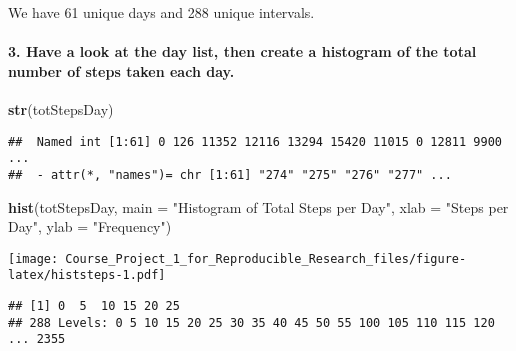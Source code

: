 \documentclass[]{article}
\newenvironment{Shaded}{\begin{snugshade}}{\end{snugshade}}
\newcommand{\KeywordTok}[1]{\textcolor[rgb]{0.13,0.29,0.53}{\textbf{#1}}}
\newcommand{\DataTypeTok}[1]{\textcolor[rgb]{0.13,0.29,0.53}{#1}}
\newcommand{\StringTok}[1]{\textcolor[rgb]{0.31,0.60,0.02}{#1}}
\newcommand{\OperatorTok}[1]{\textcolor[rgb]{0.81,0.36,0.00}{\textbf{#1}}}
\newcommand{\NormalTok}[1]{#1}
\let\oldparagraph\paragraph
\renewcommand{\paragraph}[1]{\oldparagraph{#1}\mbox{}}
\begin{document}
We have 61 unique days and 288 unique intervals.

\paragraph{3. Have a look at the day list, then create a histogram of
the total number of steps taken each
day.}\label{have-a-look-at-the-day-list-then-create-a-histogram-of-the-total-number-of-steps-taken-each-day.}

\begin{Shaded}
\begin{Highlighting}[]
\KeywordTok{str}\NormalTok{(totStepsDay)}
\end{Highlighting}
\end{Shaded}

\begin{verbatim}
##  Named int [1:61] 0 126 11352 12116 13294 15420 11015 0 12811 9900 ...
##  - attr(*, "names")= chr [1:61] "274" "275" "276" "277" ...
\end{verbatim}

\begin{Shaded}
\begin{Highlighting}[]
\KeywordTok{hist}\NormalTok{(totStepsDay, }\DataTypeTok{main =} \StringTok{"Histogram of Total Steps per Day"}\NormalTok{,}
     \DataTypeTok{xlab =} \StringTok{"Steps per Day"}\NormalTok{, }\DataTypeTok{ylab =} \StringTok{"Frequency"}\NormalTok{)}
\end{Highlighting}
\end{Shaded}

\texttt{[image: Course\_Project\_1\_for\_Reproducible\_Research\_files/figure-latex/histsteps-1.pdf]}

\begin{Shaded}
\end{Shaded}

\begin{verbatim}
## [1] 0  5  10 15 20 25
## 288 Levels: 0 5 10 15 20 25 30 35 40 45 50 55 100 105 110 115 120 ... 2355
\end{verbatim}
\end{document}
